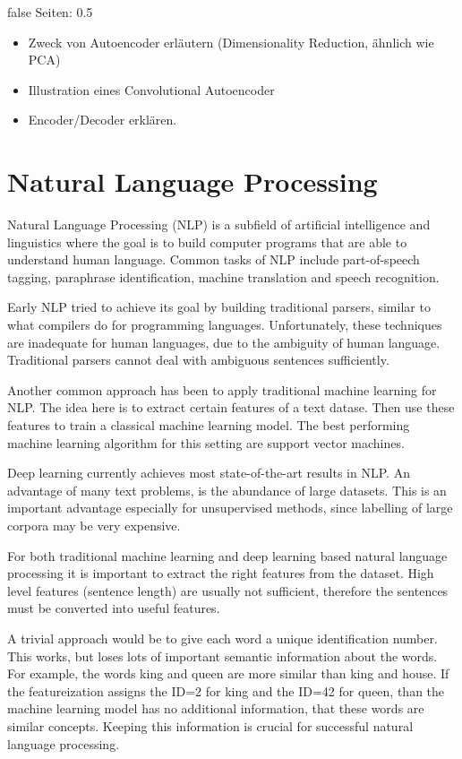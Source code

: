 \documentclass[draft,final,oneside]{vutinfth} %
\begin{document}
\if false
Seiten: 0.5
\begin{itemize}
\item Zweck von Autoencoder erläutern (Dimensionality Reduction, ähnlich wie PCA)
\item Illustration eines Convolutional Autoencoder
\item Encoder/Decoder erklären.
\end{itemize}
\fi


\section{Natural Language Processing} \label{nlpbackground}

Natural Language Processing (NLP) is a subfield of artificial intelligence and linguistics where the goal is to build computer programs that are able to understand human language. Common tasks of NLP include part-of-speech tagging, paraphrase identification, machine translation and speech recognition.

Early NLP tried to achieve its goal by building traditional parsers, similar to what compilers do for programming languages. Unfortunately, these techniques are inadequate for human languages, due to the ambiguity of human language. Traditional parsers cannot deal with ambiguous sentences sufficiently.

Another common approach has been to apply traditional machine learning for NLP. The idea here is to extract certain features of a  text datase. Then use these features to train a classical machine learning model. The best performing machine learning algorithm for this setting are support vector machines.

Deep learning currently achieves most state-of-the-art results in NLP. An advantage of many text problems, is the abundance of large datasets. This is an important advantage especially for unsupervised methods, since labelling of large corpora may be very expensive.

For both traditional machine learning and deep learning based natural language processing it is important to extract the right features from the dataset. High level features (sentence length) are usually not sufficient, therefore the sentences must be converted into useful features.

A trivial approach would be to give each word a unique identification number. This works, but loses lots of important semantic information about the words. For example, the words king and queen are more similar than king and house. If the featureization assigns the ID=2 for king and the ID=42 for queen, than the machine learning model has no additional information, that these words are similar concepts. Keeping this information is crucial for successful natural language processing.
\end{document}
